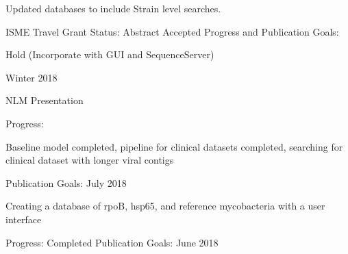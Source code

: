 \documentclass[idxtotoc,hyperref,openany]{labbook} %
\begin{document}


Updated databases to include Strain level searches. 

ISME Travel Grant Status: Abstract Accepted
\vspace{0.2cm}
Progress and Publication Goals: 

Hold (Incorporate with GUI and SequenceServer) 

Winter 2018



NLM Presentation
\vspace{0.2cm}

Progress:

Baseline model completed, pipeline for clinical datasets completed, searching for clinical dataset with longer viral contigs 

\vspace{0.2cm}
Publication Goals: July 2018 



Creating a database of rpoB, hsp65, and reference mycobacteria with a user interface

Progress: Completed
\vspace{0.2cm}
Publication Goals: June 2018
\end{document}
